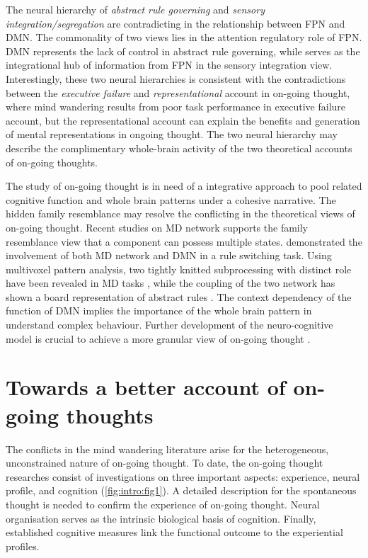 The neural hierarchy of \textit{abstract rule governing} and \textit{sensory integration/segregation} are contradicting in the relationship between FPN and DMN. The commonality of two views lies in the attention regulatory role of FPN. DMN represents the lack of control in abstract rule governing, while serves as the integrational hub of information from FPN in the sensory integration view. Interestingly, these two neural hierarchies is consistent with the contradictions between the \textit{executive failure} and \textit{representational} account in on-going thought, where mind wandering results from poor task performance in executive failure account, but the representational account can explain the benefits and generation of mental representations in ongoing thought. The two neural hierarchy may describe the complimentary whole-brain activity of the two theoretical accounts of on-going thoughts. 

The study of on-going thought is in need of a integrative approach to pool related cognitive function and whole brain patterns under a cohesive narrative. The hidden family resemblance may resolve the conflicting in the theoretical views of on-going thought. Recent studies on MD network supports the family resemblance view that a component can possess multiple states.  demonstrated the involvement of both MD network and DMN in a rule switching task. Using multivoxel pattern analysis, two tightly knitted subprocessing with distinct role have been revealed in MD tasks \cite{Crittenden2015}, while the coupling of the two network has shown a board representation of abstract rules \cite{Crittenden2016}. The context dependency of the function of DMN implies the importance of the whole brain pattern in understand complex behaviour. Further development of the neuro-cognitive model is crucial to achieve a more granular view of on-going thought \cite{Mittner2016,SmallwoodFrontiers2013}. 

\section{Towards a better account of on-going thoughts}

The conflicts in the mind wandering literature arise for the heterogeneous, unconstrained nature of on-going thought. To date, the on-going thought researches consist of investigations on three important aspects: experience, neural profile, and cognition (\cref{fig:intro:fig1}). A detailed description for the spontaneous thought is needed to confirm the experience of on-going thought. Neural organisation serves as the intrinsic biological basis of cognition. Finally, established cognitive measures link the functional outcome to the experiential profiles. 

